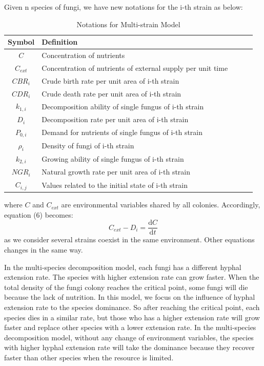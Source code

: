 \documentclass[12pt]{article}
\begin{document}
Given n species of fungi, we have new notations for the i-th strain as below:
\begin{table}[H]
	\centering
	\caption{Notations for Multi-strain Model}\label{y}
	\begin{tabularx}{0.9\textwidth}{cllll}
		\toprule
		
		Symbol & Definition\\
		\midrule
		
		\rowcolor{mygray}
		$C$&Concentration of nutrients\\
		\rowcolor{mygray}
		$C_{ext}$&Concentration of nutrients of external supply per unit time\\
		$CBR_{i}$&Crude birth rate per unit area of i-th strain\\
		$CDR_{i}$&Crude death rate per unit area of i-th strain\\
		$k_{1,i}$&Decomposition ability of single fungus of i-th strain\\
		$D_{i}$&Decomposition rate per unit area of i-th strain\\
		$P_{0,i}$&Demand for nutrients of single fungus of i-th strain\\
		$\rho_{i}$&Density of fungi of i-th strain\\
		$k_{2,i}$&Growing ability of single fungus of i-th strain\\
		$NGR_{i}$&Natural growth rate per unit area of i-th strain\\
		$C_{i,j}$&Values related to the initial state of i-th strain\\
		
		\bottomrule
	\end{tabularx}
\end{table}
where $C$ and $C_{ext}$ are environmental variables shared by all colonies. Accordingly, equation (6) becomes:
\begin{equation}
	C_{ext}-D_{i}=\frac{\mathrm{d}C}{\mathrm{d}t}
\end{equation}
as we consider several strains coexist in the same environment. Other equations changes in the same way.

In the multi-species decomposition model, each fungi has a different hyphal extension rate. The species with higher extension rate can grow faster. When the total density of the fungi colony reaches the critical point, some fungi will die because the lack of nutrition. In this model, we focus on the influence of hyphal extension rate to the species dominance. So after reaching the critical point, each species dies in a similar rate, but those who has a higher extension rate will grow faster and replace other species with a lower extension rate. In the multi-species decomposition model, without any change of environment variables, the species with higher hyphal extension rate will take the dominance because they recover faster than other species when the resource is limited.
\end{document}
